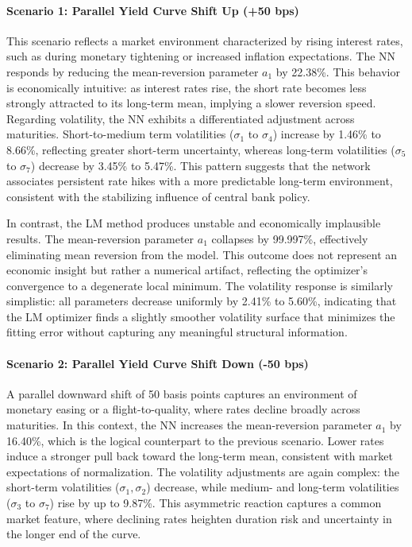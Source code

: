 \paragraph{Scenario 1: Parallel Yield Curve Shift Up (+50 bps)}
This scenario reflects a market environment characterized by rising interest rates, such as during monetary tightening or increased inflation expectations. The NN responds by reducing the mean-reversion parameter \( a_1 \) by 22.38\%. This behavior is economically intuitive: as interest rates rise, the short rate becomes less strongly attracted to its long-term mean, implying a slower reversion speed. Regarding volatility, the NN exhibits a differentiated adjustment across maturities. Short-to-medium term volatilities (\( \sigma_1 \) to \( \sigma_4 \)) increase by 1.46\% to 8.66\%, reflecting greater short-term uncertainty, whereas long-term volatilities (\( \sigma_5 \) to \( \sigma_7 \)) decrease by 3.45\% to 5.47\%. This pattern suggests that the network associates persistent rate hikes with a more predictable long-term environment, consistent with the stabilizing influence of central bank policy.

In contrast, the LM method produces unstable and economically implausible results. The mean-reversion parameter \( a_1 \) collapses by 99.997\%, effectively eliminating mean reversion from the model. This outcome does not represent an economic insight but rather a numerical artifact, reflecting the optimizer’s convergence to a degenerate local minimum. The volatility response is similarly simplistic: all parameters decrease uniformly by 2.41\% to 5.60\%, indicating that the LM optimizer finds a slightly smoother volatility surface that minimizes the fitting error without capturing any meaningful structural information.

\paragraph{Scenario 2: Parallel Yield Curve Shift Down (-50 bps)}
A parallel downward shift of 50 basis points captures an environment of monetary easing or a flight-to-quality, where rates decline broadly across maturities. In this context, the NN increases the mean-reversion parameter \( a_1 \) by 16.40\%, which is the logical counterpart to the previous scenario. Lower rates induce a stronger pull back toward the long-term mean, consistent with market expectations of normalization. The volatility adjustments are again complex: the short-term volatilities (\( \sigma_1, \sigma_2 \)) decrease, while medium- and long-term volatilities (\( \sigma_3 \) to \( \sigma_7 \)) rise by up to 9.87\%. This asymmetric reaction captures a common market feature, where declining rates heighten duration risk and uncertainty in the longer end of the curve.

